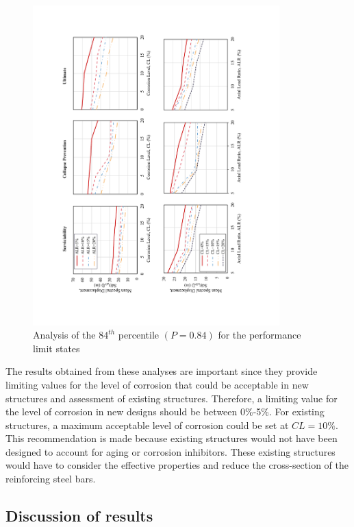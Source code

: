 \begin{figure}[htbp]
	\centering
	\includegraphics[width=0.85\textwidth]{VAC Thesis 2.0/Chapter-5/figs/summary_84_ptile_01.pdf}
	\caption{Analysis of the $84^{th}$ percentile $(P=0.84)$ for the performance limit states}
	\label{fig:84_ptile_vs_CL}
\end{figure}

The results obtained from these analyses are important since they provide limiting values for the level of corrosion that could be acceptable in new structures and assessment of existing structures. Therefore, a limiting value for the level of corrosion in new designs should be between 0\%-5\%. For existing structures, a maximum acceptable level of corrosion could be set at $CL=10\%$. This recommendation is made because existing structures would not have been designed to account for aging or corrosion inhibitors. These existing structures would have to consider the effective properties and reduce the cross-section of the reinforcing steel bars.

\subsection{Discussion of results}

